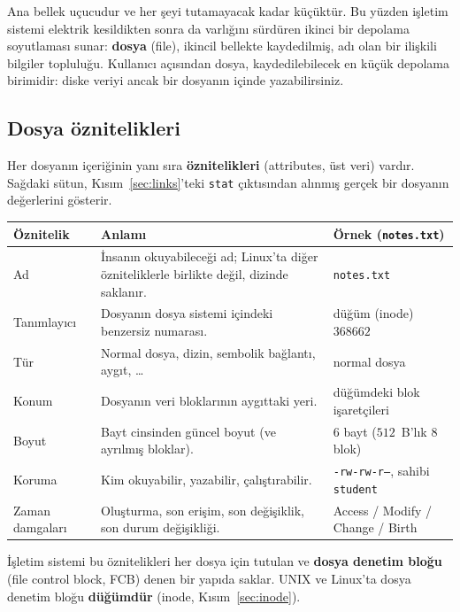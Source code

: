 \documentclass[11pt,a4paper]{article}
\newcommand{\term}[1]{\textbf{\color{mintdeep}#1}}
\newcommand{\cmd}[1]{\texttt{#1}}
\begin{document}
Ana bellek uçucudur ve her şeyi tutamayacak kadar küçüktür. Bu yüzden işletim sistemi elektrik kesildikten sonra da varlığını sürdüren ikinci bir depolama soyutlaması sunar: \term{dosya} (file), ikincil bellekte kaydedilmiş, adı olan bir ilişkili bilgiler topluluğu. Kullanıcı açısından dosya, kaydedilebilecek en küçük depolama birimidir: diske veriyi ancak bir dosyanın içinde yazabilirsiniz.

\subsection{Dosya öznitelikleri}

Her dosyanın içeriğinin yanı sıra \term{öznitelikleri} (attributes, üst veri) vardır. Sağdaki sütun, Kısım~\ref{sec:links}'teki \cmd{stat} çıktısından alınmış gerçek bir dosyanın değerlerini gösterir.

\begin{center}
\renewcommand{\arraystretch}{1.3}
\begin{tabularx}{\linewidth}{>{\raggedright\arraybackslash}p{2.6cm} >{\raggedright\arraybackslash}X >{\raggedright\arraybackslash}p{4.4cm}}
\toprule
\textbf{Öznitelik} & \textbf{Anlamı} & \textbf{Örnek (\texttt{notes.txt})} \\
\midrule
Ad & İnsanın okuyabileceği ad; Linux'ta diğer özniteliklerle birlikte değil, dizinde saklanır. & \texttt{notes.txt} \\
Tanımlayıcı & Dosyanın dosya sistemi içindeki benzersiz numarası. & düğüm (inode) $368662$ \\
Tür & Normal dosya, dizin, sembolik bağlantı, aygıt, \dots & normal dosya \\
Konum & Dosyanın veri bloklarının aygıttaki yeri. & düğümdeki blok işaretçileri \\
Boyut & Bayt cinsinden güncel boyut (ve ayrılmış bloklar). & $6$ bayt ($512$~B'lık $8$ blok) \\
Koruma & Kim okuyabilir, yazabilir, çalıştırabilir. & \texttt{-rw-rw-r--}, sahibi \texttt{student} \\
Zaman damgaları & Oluşturma, son erişim, son değişiklik, son durum değişikliği. & Access / Modify / Change / Birth \\
\bottomrule
\end{tabularx}
\end{center}

İşletim sistemi bu öznitelikleri her dosya için tutulan ve \term{dosya denetim bloğu} (file control block, FCB) denen bir yapıda saklar. UNIX ve Linux'ta dosya denetim bloğu \term{düğümdür} (inode, Kısım~\ref{sec:inode}).
\end{document}
